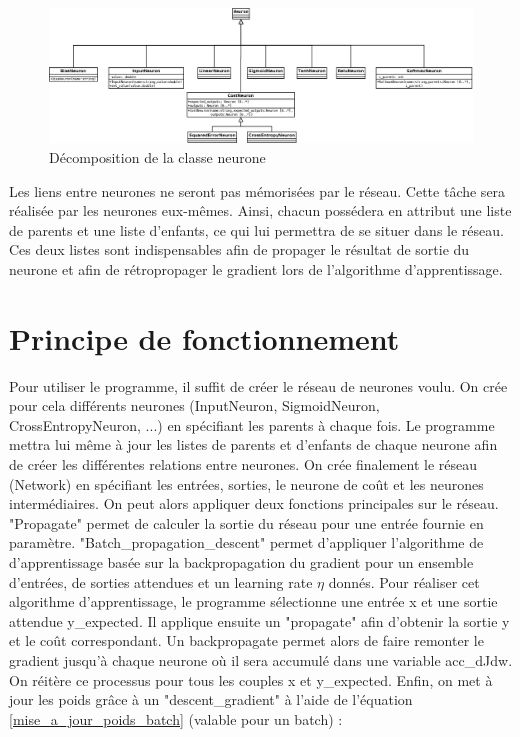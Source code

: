 \documentclass{report}
\theoremstyle{plain}
\theoremstyle{definition}
\theoremstyle{remark}
\begin{document}
\begin{figure}
\begin{center}
\includegraphics[scale=0.18]{images/uml_neurone_imp1.png}
\caption{Décomposition de la classe neurone}
\label{uml_neurone_imp1}
\end{center}
\end{figure}


Les liens entre neurones ne seront pas mémorisées par le réseau. Cette tâche sera réalisée par les neurones eux-mêmes. Ainsi, chacun possédera en attribut une liste de parents et une liste d'enfants, ce qui lui permettra de se situer dans le réseau. Ces deux listes sont indispensables afin de propager le résultat de sortie du neurone et afin de rétropropager le gradient lors de l'algorithme d'apprentissage.
	
\section{Principe de fonctionnement}
Pour utiliser le programme, il suffit de créer le réseau de neurones voulu. On crée pour cela différents neurones (InputNeuron, SigmoidNeuron, CrossEntropyNeuron, ...) en spécifiant les parents à chaque fois. Le programme mettra lui même à jour les listes de parents et d'enfants de chaque neurone afin de créer les différentes relations entre neurones. On crée finalement le réseau (Network) en spécifiant les entrées, sorties, le neurone de coût et les neurones intermédiaires.
On peut alors appliquer deux fonctions principales sur le réseau. "Propagate" permet de calculer la sortie du réseau pour une entrée fournie en paramètre. "Batch\_propagation\_descent" permet d'appliquer l'algorithme de d'apprentissage basée sur la backpropagation du gradient pour un ensemble d'entrées, de sorties attendues et un learning rate $\eta$ donnés. 
Pour réaliser cet algorithme d'apprentissage, le programme sélectionne une entrée x et une sortie attendue y\_expected. Il applique ensuite un "propagate" afin d'obtenir la sortie y et le coût correspondant. Un backpropagate permet alors de faire remonter le gradient jusqu'à chaque neurone où il sera accumulé dans une variable acc\_dJdw. On réitère ce processus pour tous les couples x et y\_expected. Enfin, on met à jour les poids grâce à un "descent\_gradient" à l'aide de l'équation \ref{mise_a_jour_poids_batch} (valable pour un batch) :
\end{document}
